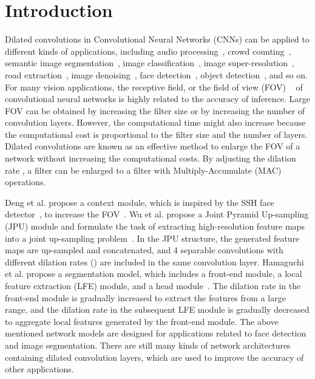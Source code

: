 \documentclass[10pt,twocolumn,letterpaper]{article}
\begin{document}
\section{Introduction}
\label{sec:introduction}

Dilated convolutions in Convolutional Neural Networks (CNNs) can be applied to different kinds of applications, including audio processing~\cite{Hussain19}, crowd counting~\cite{Li18_0}, semantic image segmentation~\cite{Hamaguchi17,Mehta18,Wang18,Wu19}, image classification~\cite{Lei19}, image super-resolution~\cite{Lin18}, road extraction~\cite{Zhou18}, image denoising~\cite{Tian18}, face detection~\cite{Li18_1}, object detection~\cite{Li18_2}, and so on. For many vision applications, the receptive field, or the field of view (FOV) ~\cite{Luo17} of convolutional neural networks is highly related to the accuracy of inference. Large FOV can be obtained by increasing the filter size or by increasing the number of convolution layers. However, the computational time might also increase because the computational cost is proportional to the filter size and the number of layers. Dilated convolutions are known as an effective method to enlarge the FOV of a network without increasing the computational costs. By adjusting the dilation rate , a  filter can be enlarged to a  filter with  Multiply-Accumulate (MAC) operations.

Deng et al. propose a context module, which is inspired by the SSH face detector~\cite{Najibi17}, to increase the FOV~\cite{Deng19}. Wu et al. propose a Joint Pyramid Up-sampling (JPU) module and formulate the task of extracting high-resolution feature maps into a joint up-sampling problem~\cite{Wu19}. In the JPU structure, the generated feature maps are up-sampled and concatenated, and 4 separable convolutions with different dilation rates () are included in the same convolution layer. Hamaguchi et al. propose a segmentation model, which includes a front-end module, a local feature extraction (LFE) module, and a head module~\cite{Hamaguchi17}. The dilation rate in the front-end module is gradually increased to extract the features from a large range, and the dilation rate in the subsequent LFE module is gradually decreased to aggregate local features generated by the front-end module. The above mentioned network models are designed for applications related to face detection and image segmentation. There are still many kinds of network architectures containing dilated convolution layers, which are used to improve the accuracy of other applications.
\end{document}
